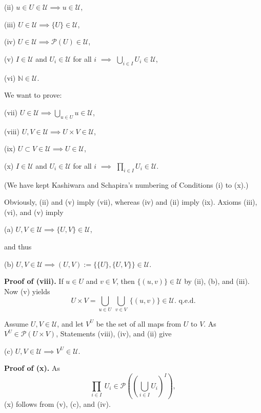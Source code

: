 \documentclass[12pt]{article}
\theoremstyle{remark}
\theoremstyle{definition}
\newcommand{\n}{\noindent}
\begin{document}
(ii) $u\in U\in\mathcal U\implies u\in \mathcal U$,

(iii) $U\in\mathcal U\implies\{U\}\in\mathcal U$,

(iv) $U\in\mathcal U\implies\mathcal P(U)\in\mathcal U$,

(v) $I\in\mathcal U$ and $U_i\in\mathcal U$ for all $i$ $\implies$ $\bigcup_{i\in I}U_i\in\mathcal U$,

(vi) $\mathbb N\in\mathcal U$.

\n We want to prove:

(vii) $U\in\mathcal U\implies\bigcup_{u\in U}u\in\mathcal U$,

(viii) $U,V\in\mathcal U\implies U\times V\in\mathcal U$,

(ix) $U\subset V\in\mathcal U\implies U\in\mathcal U$,

(x) $I\in \mathcal U$ and $U_i\in\mathcal U$ for all $i$ $\implies$ $\prod_{i\in I}U_i\in\mathcal U$.

\n(We have kept Kashiwara and Schapira's numbering of Conditions (i) to (x).) 

\n Obviously, (ii) and (v) imply (vii), whereas (iv) and (ii) imply (ix). Axioms (iii), (vi), and (v) imply

(a) $U,V\in\mathcal U\implies\{U,V\}\in\mathcal U$,

\n and thus

(b) $U,V\in\mathcal U\implies(U,V):=\{\{U\},\{U,V\}\}\in\mathcal U$.

\n\textbf{Proof of (viii).} If $u\in U$ and $v\in V$, then $\{(u,v)\}\in\mathcal U$ by (ii), (b), and (iii). Now (v) yields 
$$
U\times V=\bigcup_{u\in U}\ \bigcup_{v\in V}\ \{(u,v)\}\in\mathcal U.\text{ q.e.d.} 
$$ 

Assume $U,V\in\mathcal U$, and let $V^U$ be the set of all maps from $U$ to $V$. As $V^U\in\mathcal P(U\times V)$, Statements (viii), (iv), and (ii) give

(c) $U,V\in\mathcal U\implies V^U\in\mathcal U$. 

\n\textbf{Proof of (x).} As 
$$
\prod_{i\in I}\ U_i\in\mathcal P\left(\left(\bigcup_{i\in I}U_i\right)^I\right),
$$
(x) follows from (v), (c), and (iv). 
%
\end{document}
